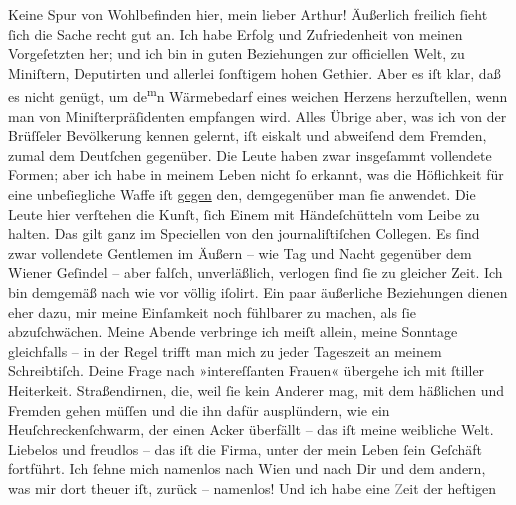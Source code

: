 \pstart
           Keine Spur von Wohlbefinden hier, mein lieber Arthur! Äußerlich freilich{ }ſieht{ }ſich
               die Sache recht gut an. Ich habe Erfolg und Zufriedenheit von meinen Vorgeſetzten
               her; und ich bin in guten Beziehungen zur officiellen Welt, zu Miniſtern, Deputirten
               und allerlei{ }ſonſtigem hohen Gethier. Aber es iſt klar, daß \strikeout{\textcolor{gray}{d}} es nicht genügt, um de\substVorne{}\textsuperscript{m}\substDazwischen{}n\substHinten{} Wärmebedarf eines weichen Herzens herzuſtellen, wenn man von
               Miniſterpräſidenten empfangen wird. Alles Übrige aber, was ich von der Brüſſeler Bevölkerung kennen gelernt, iſt eiskalt
               und abweiſend dem Fremden, zumal dem Deutſchen gegenüber. Die Leute haben zwar  insgeſammt vollendete Formen; aber ich habe in
               meinem Leben nicht{ }ſo erkannt, was die Höflichkeit für eine unbeſiegliche {\pb}Waffe iſt \uline{gegen} den,
               demgegenüber man{ }ſie anwendet. Die Leute hier verſtehen die Kunſt,{ }ſich Einem mit
               Händeſchütteln vom  Leibe zu halten. Das gilt
               ganz im Speciellen von den journaliſtiſchen Collegen. Es{ }ſind zwar vollendete
               Gentlemen im Äußern – wie Tag und Nacht gegenüber dem Wiener Geſindel – aber falſch, unverläßlich, verlogen{ }ſind{ }ſie zu gleicher
               Zeit. Ich bin demgemäß nach wie vor völlig iſolirt. Ein paar äußerliche Beziehungen
               dienen eher dazu, mir meine Einſamkeit noch fühlbarer zu machen, als{ }ſie
               abzuſchwächen. Meine Abende verbringe ich meiſt allein, meine Sonntage gleichfalls –
               in der Regel trifft man mich zu jeder Tageszeit an meinem Schreibtiſch. Deine Frage
               nach »intereſſanten Frauen« übergehe ich mit{ }ſtiller Heiterkeit. Straßendirnen, die,
               weil{ }ſie kein Anderer mag, mit dem häßlichen und \label{K_L02668-4v}\label{K_L02668-4} Fremden gehen müſſen und die ihn dafür ausplündern, wie ein
               Heuſchreckenſchwarm, der einen Acker überfällt – das iſt meine {\pb}weibliche Welt. Liebelos und freudlos – das iſt die
               Firma, unter der mein Leben{ }ſein Geſchäft fortführt. Ich{ }ſehne mich namenlos nach Wien und nach Dir und dem andern, was mir dort
               theuer iſt, zurück – namenlos! Und ich habe eine \textcolor{gray}{Z}eit der heftigen

